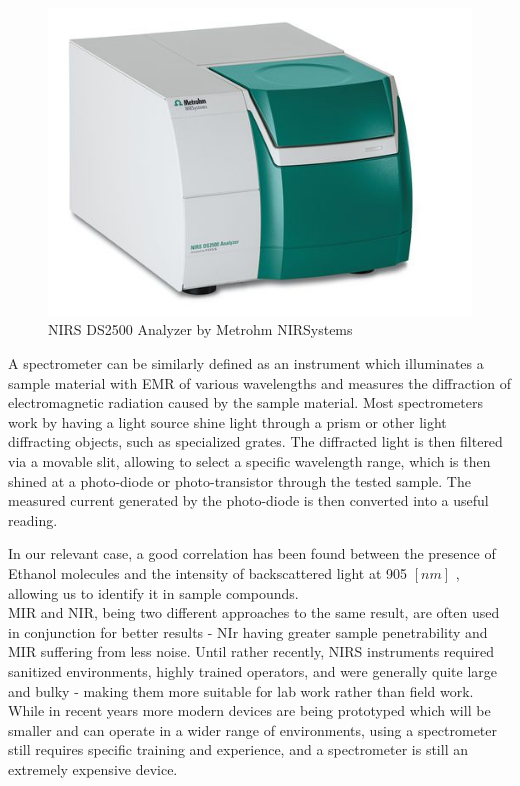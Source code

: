 \documentclass[twoside]{ctuthesis}
\theoremstyle{plain}
\theoremstyle{definition}
\theoremstyle{note}
\begin{document}
\begin{figure}[H]
	\centering
	\includegraphics[scale = 0.75]{spectrometer}
	\caption{NIRS DS2500 Analyzer by Metrohm NIRSystems}
\end{figure}

A spectrometer can be similarly defined as an instrument which illuminates a sample material with EMR of various wavelengths and measures the diffraction of electromagnetic radiation caused by the sample material. Most spectrometers work by having a light source shine light through a prism or other light diffracting objects, such as specialized grates. The diffracted light is then filtered via a movable slit, allowing to select a specific wavelength range, which is then shined at a photo-diode or photo-transistor through the tested sample. The measured current generated by the photo-diode is then converted into a useful reading.
%

In our relevant case, a good correlation has been found between the presence of Ethanol molecules and the intensity of backscattered light at 905 $[nm]$  \cite{NIR_Spectroscopy_Ethanol}, allowing us to identify it in sample compounds.\\
MIR and NIR, being two different approaches to the same result, are often used in conjunction for better results - NIr having greater sample penetrability and MIR suffering from less noise.
Until rather recently, NIRS instruments required sanitized environments, highly trained operators, and were generally quite large and bulky - making them more suitable for lab work rather than field work\cite{NIR_For_Spices}.\\ While in recent years more modern devices are being prototyped which will be smaller and can operate in a wider range of environments, using a spectrometer still requires specific training and experience, and a spectrometer is still an extremely expensive device.
\end{document}
